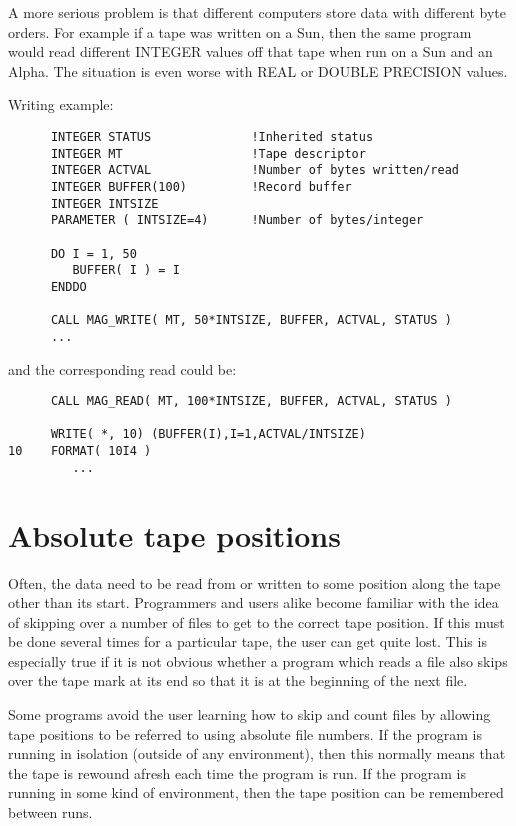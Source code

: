 A more serious problem is that different computers store data with
different byte orders. For example if a tape was written on a Sun, then the
same program would read different INTEGER values off that tape when run on a
Sun and an Alpha. The situation is even worse with REAL or DOUBLE PRECISION
values.

Writing example:
\small
\begin{verbatim}
      INTEGER STATUS              !Inherited status
      INTEGER MT                  !Tape descriptor
      INTEGER ACTVAL              !Number of bytes written/read
      INTEGER BUFFER(100)         !Record buffer
      INTEGER INTSIZE
      PARAMETER ( INTSIZE=4)      !Number of bytes/integer

      DO I = 1, 50
         BUFFER( I ) = I
      ENDDO

      CALL MAG_WRITE( MT, 50*INTSIZE, BUFFER, ACTVAL, STATUS )
      ...
\end{verbatim}
\normalsize
and the corresponding read could be:
\small
\begin{verbatim}
      CALL MAG_READ( MT, 100*INTSIZE, BUFFER, ACTVAL, STATUS )

      WRITE( *, 10) (BUFFER(I),I=1,ACTVAL/INTSIZE)
10    FORMAT( 10I4 )
         ...
\end{verbatim}
\normalsize

\section{\label{positions}Absolute tape positions}
Often, the data need to be read from or written to some position along
the tape other than its start. Programmers and users alike become
familiar with the idea of skipping over a number of files to get to
the correct tape position. If this must be done several times for a
particular tape, the user can get quite lost. This is especially true
if it is not obvious whether a program which reads a file also skips
over the tape mark at its end so that it is at the beginning of the next
file.

Some programs avoid the user learning how to skip and count files by
allowing tape positions to be referred to using absolute file numbers.
If the program is running in isolation (outside of any environment),
then this normally means that the tape is rewound afresh each time the
program is run. If the program is running in some kind of environment,
then the tape position can be remembered between runs.

